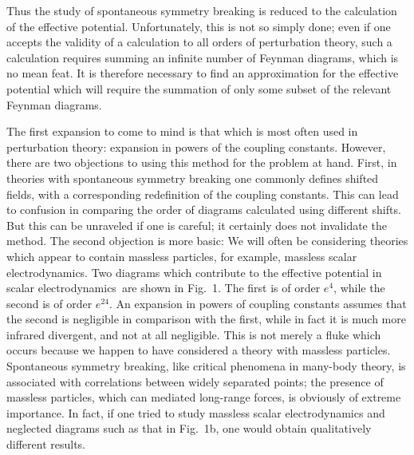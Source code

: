 \documentclass[12pt,epsf]{report}
\begin{document}
Thus the study of spontaneous symmetry breaking is reduced to the
calculation of the effective potential.  Unfortunately, this is not so
simply done; even if one accepts the validity of a calculation to all
orders of perturbation theory, such a calculation requires summing an
infinite number of Feynman diagrams, which is no mean feat.  It is
therefore necessary to find an approximation for the effective
potential which will require the summation of only some subset of the
relevant Feynman diagrams.

The first expansion to come to mind is that which is most often used
in perturbation theory: expansion in powers of the coupling constants.
However, there are two objections to using this method for the problem
at hand.  First, in theories with spontaneous symmetry breaking one
commonly defines shifted fields, with a corresponding redefinition of
the coupling constants.  This can lead to confusion in comparing the
order of diagrams calculated using different shifts.  But this can be
unraveled if one is careful; it certainly does not invalidate the
method.  The second objection is more basic: We will often be
considering theories which appear to contain massless particles, for
example, massless scalar electrodynamics.   Two diagrams which 
contribute to the effective potential in scalar electrodynamics\
are shown in Fig.~1.  The first is of order $e^4$, while the second is 
of order $e^{24}$.  An expansion in powers of coupling constants assumes
that the second is negligible in comparison with the first, while in fact it is 
much more infrared divergent, and not at all negligible.  This is not merely 
a fluke which occurs because we happen to have considered a theory with 
massless particles.  Spontaneous symmetry breaking, like critical 
phenomena in many-body theory, is associated with correlations between 
widely separated points; the presence of massless particles, which can
mediated long-range forces, is obviously of extreme importance.  In fact, if one 
tried to study  massless scalar electrodynamics and neglected diagrams such
as that in Fig.~1b, one would obtain qualitatively different results.
\end{document}
